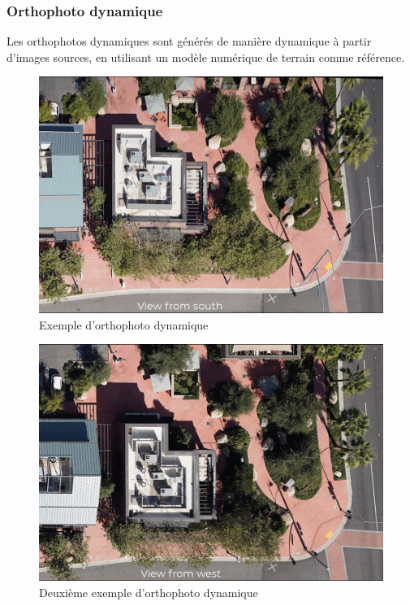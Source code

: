 \subsubsection{Orthophoto dynamique}

Les orthophotos dynamiques sont générés de manière dynamique à partir d'images sources, en utilisant un modèle numérique de terrain comme référence.
\begin{figure}[H]
    \centering
    \includegraphics[width=1\linewidth]{03-tail//A1_fondamentaux_ML//A1_figures/A1_10_ortophoto_dynamique1.png}
    \caption{Exemple d’orthophoto dynamique \cite{barrette_different_2022}}
    \label{fig:A1_10_ortophoto_dynamique1}
\end{figure}

\begin{figure}[H]
    \centering
    \includegraphics[width=1\linewidth]{03-tail//A1_fondamentaux_ML//A1_figures/A1_11_orthophoto_dynamique2.png}
    \caption{Deuxième exemple d’orthophoto dynamique \cite{barrette_different_2022}}
    \label{fig:A1_11_orthophoto_dynamique2}
\end{figure}

